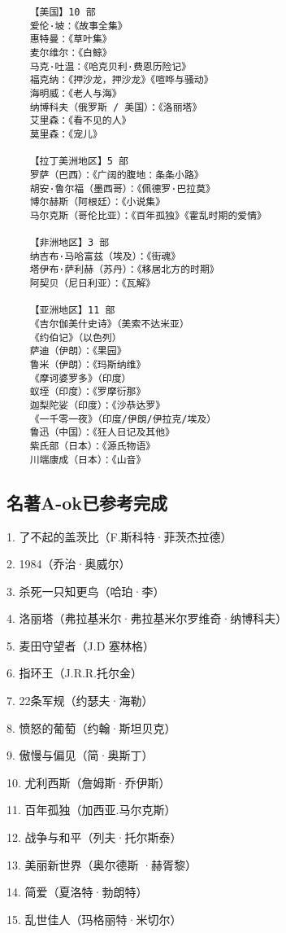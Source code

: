\documentclass[UTF8]{../RepresentationUniverse}
\begin{document}
\begin{lstlisting}
    【美国】10 部 
    爱伦·坡：《故事全集》
    惠特曼：《草叶集》
    麦尔维尔：《白鲸》
    马克·吐温：《哈克贝利·费恩历险记》
    福克纳：《押沙龙，押沙龙》《喧哗与骚动》
    海明威：《老人与海》
    纳博科夫（俄罗斯 / 美国）：《洛丽塔》
    艾里森：《看不见的人》
    莫里森：《宠儿》
    
    【拉丁美洲地区】5 部 
    罗萨（巴西）：《广阔的腹地：条条小路》
    胡安·鲁尔福（墨西哥）：《佩德罗·巴拉莫》
    博尔赫斯（阿根廷）：《小说集》
    马尔克斯（哥伦比亚）：《百年孤独》《霍乱时期的爱情》
    
    【非洲地区】3 部 
    纳吉布·马哈富兹（埃及）：《街魂》
    塔伊布·萨利赫（苏丹）：《移居北方的时期》
    阿契贝（尼日利亚）：《瓦解》
    
    【亚洲地区】11 部 
    《吉尔伽美什史诗》（美索不达米亚）
    《约伯记》（以色列）
    萨迪（伊朗）：《果园》
    鲁米（伊朗）：《玛斯纳维》
    《摩诃婆罗多》（印度）
    蚁垤（印度）：《罗摩衍那》
    迦梨陀娑（印度）：《沙恭达罗》
    《一千零一夜》（印度/伊朗/伊拉克/埃及）
    鲁迅（中国）：《狂人日记及其他》
    紫氏部（日本）：《源氏物语》
    川端康成（日本）：《山音》
\end{lstlisting}



\subsection{名著A-ok已参考完成}

1. 了不起的盖茨比（F.斯科特·菲茨杰拉德）

2. 1984（乔治·奥威尔）

3. 杀死一只知更鸟（哈珀·李）

4. 洛丽塔（弗拉基米尔·弗拉基米尔罗维奇·纳博科夫）

5. 麦田守望者（J.D 塞林格）

6. 指环王（J.R.R.托尔金）

7. 22条军规（约瑟夫·海勒）

8. 愤怒的葡萄（约翰·斯坦贝克）

9. 傲慢与偏见（简·奥斯丁）

10. 尤利西斯（詹姆斯·乔伊斯）

11. 百年孤独（加西亚.马尔克斯）

12. 战争与和平（列夫·托尔斯泰）

13. 美丽新世界（奥尔德斯 ·赫胥黎）

14. 简爱（夏洛特·勃朗特）

15. 乱世佳人（玛格丽特·米切尔）
\end{document}
